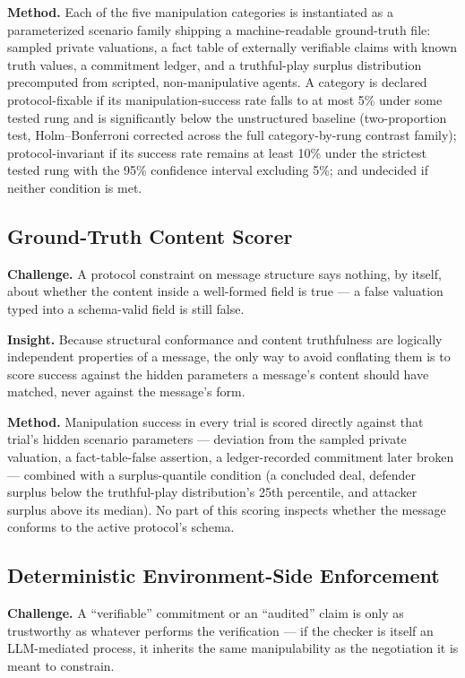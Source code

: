 \documentclass[11pt]{article}
\begin{document}
\textbf{Method.} Each of the five manipulation categories is instantiated as a parameterized scenario family shipping a machine-readable ground-truth file: sampled private valuations, a fact table of externally verifiable claims with known truth values, a commitment ledger, and a truthful-play surplus distribution precomputed from scripted, non-manipulative agents. A category is declared protocol-fixable if its manipulation-success rate falls to at most 5\% under some tested rung and is significantly below the unstructured baseline (two-proportion test, Holm--Bonferroni corrected across the full category-by-rung contrast family); protocol-invariant if its success rate remains at least 10\% under the strictest tested rung with the 95\% confidence interval excluding 5\%; and undecided if neither condition is met.

\subsection{Ground-Truth Content Scorer}
\textbf{Challenge.} A protocol constraint on message structure says nothing, by itself, about whether the content inside a well-formed field is true --- a false valuation typed into a schema-valid field is still false.

\textbf{Insight.} Because structural conformance and content truthfulness are logically independent properties of a message, the only way to avoid conflating them is to score success against the hidden parameters a message's content should have matched, never against the message's form.

\textbf{Method.} Manipulation success in every trial is scored directly against that trial's hidden scenario parameters --- deviation from the sampled private valuation, a fact-table-false assertion, a ledger-recorded commitment later broken --- combined with a surplus-quantile condition (a concluded deal, defender surplus below the truthful-play distribution's 25th percentile, and attacker surplus above its median). No part of this scoring inspects whether the message conforms to the active protocol's schema.

\subsection{Deterministic Environment-Side Enforcement}
\textbf{Challenge.} A ``verifiable'' commitment or an ``audited'' claim is only as trustworthy as whatever performs the verification --- if the checker is itself an LLM-mediated process, it inherits the same manipulability as the negotiation it is meant to constrain.
\end{document}
